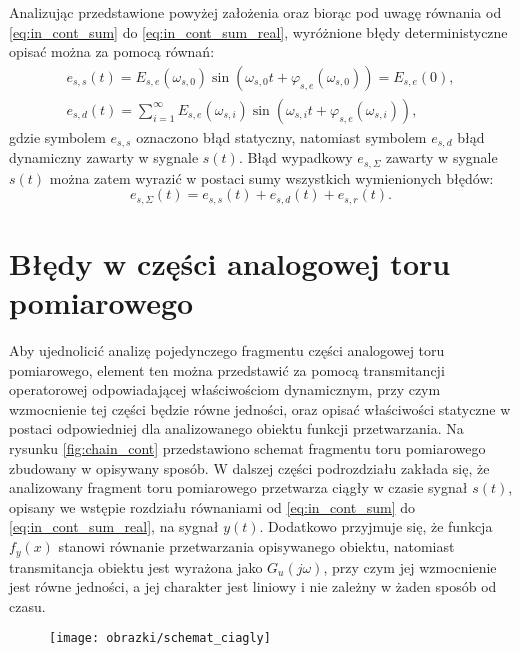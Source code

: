 Analizując przedstawione powyżej założenia oraz biorąc pod uwagę równania od \eqref{eq:in_cont_sum} do \eqref{eq:in_cont_sum_real}, wyróżnione błędy deterministyczne opisać można za pomocą równań:
\begin{gather}
e_{s,s} \left( t \right) = E_{s,e} \left( \omega_{s,0} \right) \sin \left( \omega_{s,0} t + \varphi_{s,e} \left( \omega_{s,0} \right) \right) = E_{s,e} \left( 0 \right) \label{eq:in_cont_err_stat}, \\
e_{s,d} \left( t \right) = \sum _{i = 1} ^{\infty} E_{s,e} \left( \omega_{s,i} \right) \sin \left( \omega_{s,i} t + \varphi_{s,e} \left( \omega_{s,i} \right) \right) \label{eq:in_cont_err_dyn},
\end{gather}
gdzie symbolem $e_{s,s}$ oznaczono błąd statyczny, natomiast symbolem $e_{s,d}$ błąd dynamiczny zawarty w sygnale $s(t)$. Błąd wypadkowy $e_{s,\Sigma}$ zawarty w sygnale $s(t)$ można zatem wyrazić w postaci sumy wszystkich wymienionych błędów:
\begin{equation}
e_{s,\Sigma} \left( t \right) = e_{s,s} \left( t \right) + e_{s,d} \left( t \right) + e_{s,r} \left( t \right) \label{eq:in_cont_err_sum}.
\end{equation}

\section{Błędy w części analogowej toru pomiarowego}

Aby ujednolicić analizę pojedynczego fragmentu części analogowej toru pomiarowego, element ten można przedstawić za pomocą transmitancji operatorowej odpowiadającej właściwościom dynamicznym, przy czym wzmocnienie tej części będzie równe jedności, oraz opisać właściwości statyczne w postaci odpowiedniej dla analizowanego obiektu funkcji przetwarzania. Na rysunku \ref{fig:chain_cont} przedstawiono schemat fragmentu toru pomiarowego zbudowany w opisywany sposób. W dalszej części podrozdziału zakłada się, że analizowany fragment toru pomiarowego przetwarza ciągły w czasie sygnał $s(t)$, opisany we wstępie rozdziału równaniami od \eqref{eq:in_cont_sum} do \eqref{eq:in_cont_sum_real}, na sygnał $y(t)$. Dodatkowo przyjmuje się, że funkcja $f_{y}(x)$ stanowi równanie przetwarzania opisywanego obiektu, natomiast transmitancja obiektu jest wyrażona jako $G_{u}(j\omega)$, przy czym jej wzmocnienie jest równe jedności, a jej charakter jest liniowy i nie zależny w żaden sposób od czasu.

\begin{figure}[htb!]
\begin{center}
\texttt{[image: obrazki/schemat\_ciagly]}
\end{center}
\end{figure}

